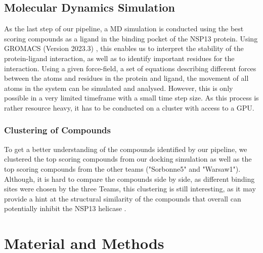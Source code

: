 \documentclass[11pt, letterpaper, titlepage]{article}
\renewcommand{\cite}{\parencite}
\begin{document}
\subsection{Molecular Dynamics Simulation}
As the last step of our pipeline, a MD simulation is conducted using the best scoring compounds as a ligand in the binding pocket of the NSP13 protein. Using GROMACS (Version 2023.3) \cite{package_GROMACS}, this enables us to interpret the stability of the protein-ligand interaction, as well as to identify important residues for the interaction. Using a given force-field, a set of equations describing different forces between the atoms and residues in the protein and ligand, the movement of all atoms in the system can be simulated and analysed. However, this is only possible in a very limited timeframe with a small time step size. As this process is rather resource heavy, it has to be conducted on a cluster with access to a GPU. 

\subsubsection{Clustering of Compounds}
To get a better understanding of the compounds identified by our pipeline, we clustered the top scoring compounds from our docking simulation as well as the top scoring compounds from the other teams ("Sorbonne5" and "Warsaw1"). Although, it is hard to compare the compounds side by side, as different binding sites were chosen by the three Teams, this clustering is still interesting, as it may provide a hint at the structural similarity of the compounds that overall can potentially inhibit the \ac{NSP13} helicase \cite{Spratt_2021}.


\section{Material and Methods}
\end{document}
